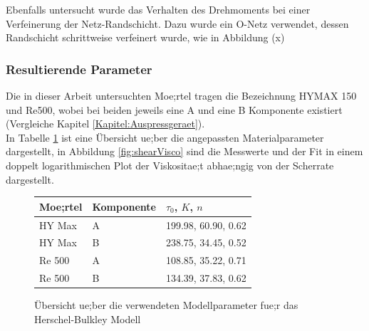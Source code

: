 Ebenfalls untersucht wurde das Verhalten des Drehmoments bei einer Verfeinerung der Netz-Randschicht. Dazu wurde ein O-Netz verwendet, dessen Randschicht schrittweise verfeinert wurde, wie in Abbildung (x) 
%
\subsubsection{Resultierende Parameter}
Die in dieser Arbeit untersuchten Moe;rtel tragen die Bezeichnung HYMAX 150 und Re500, wobei bei beiden jeweils eine A und eine B Komponente existiert (Vergleiche Kapitel \ref{Kapitel:Auspressgeraet}).\\
In Tabelle \ref{fig:resultParameter} ist eine Übersicht ue;ber die angepassten Materialparameter dargestellt, in Abbildung \ref{fig:shearVisco} sind die Messwerte und der Fit in einem doppelt logarithmischen Plot der Viskositae;t abhae;ngig von der Scherrate dargestellt.
\begin{figure}
    \centering
    \begin{tabular}{l l l}
        \textbf{Moe;rtel} & \textbf{Komponente} & $\tau_0$, $K$, $n$ \\
        \hline
        HY Max & A & 199.98, 60.90, 0.62\\ 
        HY Max & B & 238.75, 34.45, 0.52\\ 
        Re 500 & A & 108.85, 35.22, 0.71\\ 
        Re 500 & B & 134.39, 37.83, 0.62
    \end{tabular}
    \caption{Übersicht ue;ber die verwendeten Modellparameter fue;r das Herschel-Bulkley Modell}
    \label{fig:resultParameter}
\end{figure}
%
